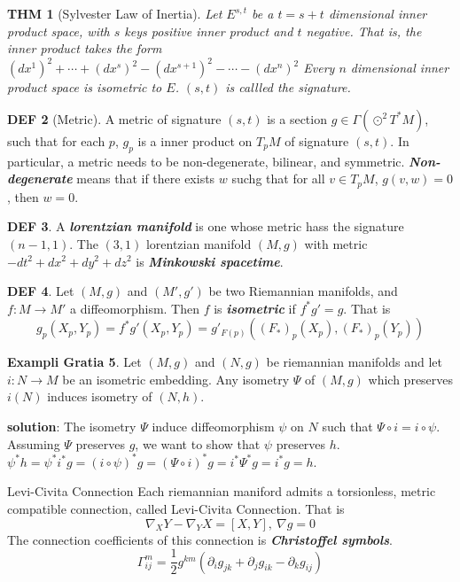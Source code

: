 \documentclass[twocolumn]{article}
\renewcommand{\emph}[1]{\textbf{\textit{#1}}}
\newcommand{\n}{\nabla}
\newcommand{\p}{\partial}
\newcommand{\G}{\Gamma}
\newtheorem{thm}{THM}
\theoremstyle{definition}
\newtheorem{example}[thm]{Exampli Gratia}
\newtheorem{defi}[thm]{DEF}
\begin{document}
\begin{thm}[Sylvester Law of Inertia]
	Let $E^{s,t}$ be a $t = s+t$ dimensional inner product space, with $s$ keys positive inner product and $t$ negative. That is, the inner product takes the form $(dx^1)^2 + \cdots + (dx^s)^2 - (dx^{s+1})^2 - \cdots - (dx^n)^2$
	Every $n$ dimensional inner product space is isometric to $E$.
	$(s, t)$ is callled the signature.
\end{thm}

\begin{defi}[Metric]
	A metric of signature $(s,t)$ is a section $g \in \G(\odot ^2 T^*M)$, such that for each $p$, $g_p$ is a inner product on $T_pM$ of signature $(s, t)$.
	In particular, a metric needs to be non-degenerate, bilinear, and symmetric.
	\emph{Non-degenerate} means that if there exists $w$ suchg that for all $v \in T_pM$, $g(v, w) = 0$, then $w = 0$.
\end{defi}

\begin{defi}
	A \emph{lorentzian manifold} is one whose metric hass the signature $(n-1,1)$.
	The $(3,1)$ lorentzian manifold $(M, g)$ with metric $-dt^2 + dx^2 + dy^2 + dz^2$ is \emph{Minkowski spacetime}.
\end{defi}

\begin{defi}
	Let $(M, g)$ and $(M', g')$ be two Riemannian manifolds, and $f: M \rightarrow M'$ a diffeomorphism. 
	Then $f$ is \emph{isometric} if $f^*g' = g$.
	That is 
	$$
	g_p(X_p, Y_p) = f^*g'(X_p, Y_p) = g'_{F(p)}((F_*)_p(X_p), (F_*)_p(Y_p))
	$$
\end{defi}

\begin{example}
	Let $(M, g)$ and $(N, g)$ be riemannian manifolds and let $i: N \rightarrow M$ be an isometric embedding. Any isometry $\Psi$ of $(M, g)$ which preserves $i(N)$ induces isometry of $(N, h)$.

	\textbf{solution}:
	The isometry $\Psi$ induce diffeomorphism $\psi$ on $N$ such that $\Psi \circ i = i \circ \psi$. 
	Assuming $\Psi$ preserves $g$, we want to show that $\psi$ preserves $h$.
	$\psi^*h = \psi^*i^*g = (i \circ \psi)^* g = (\Psi \circ i)^*g = i^* \Psi^* g = i^* g = h$.
\end{example}

\begin{fthm}{Levi-Civita Connection}{}
	Each riemannian maniford admits a torsionless, metric compatible connection, called Levi-Civita Connection.
	That is
	$$
		\n_X Y - \n_Y X = [X, Y], \ \n g = 0
	$$
	The connection coefficients of this connection is \emph{Christoffel symbols}.
	$$
		\G_{ij}^m = \frac{1}{2} g^{km}(\p_i g_{jk} + \p_j g_{ik} - \p_k g_{ij} )
	$$
\end{fthm}
\end{document}
